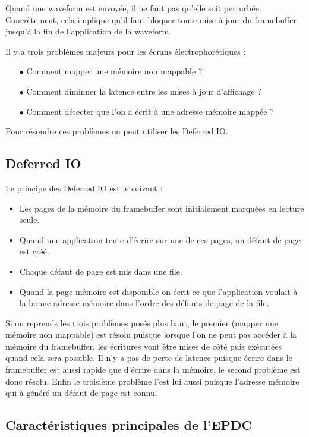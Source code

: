 Quand une waveform est envoyée, il ne faut pas qu'elle soit perturbée. Concrètement, cela implique qu'il faut bloquer toute mise à jour du framebuffer jusqu'à la fin de l'application de la waveform.

Il y a trois problèmes majeurs pour les écrans électrophorétiques :
\begin{itemize}
	\item[$\bullet$] Comment mapper une mémoire non mappable ?
	\item[$\bullet$] Comment diminuer la latence entre les mises à jour d'affichage ?
	\item[$\bullet$] Comment détecter que l'on a écrit à une adresse mémoire mappée ?
\end{itemize}

Pour résoudre ces problèmes on peut utiliser les Deferred IO.

\subsection{Deferred IO}

Le principe des Deferred IO est le suivant :
\begin{itemize}
\renewcommand{\labelitemi}{$\bullet$}
	\item Les pages de la mémoire du framebuffer sont initialement marquées en lecture seule.
	\item Quand une application tente d'écrire sur une de ces pages, un défaut de page est créé.
	\item Chaque défaut de page est mis dans une file.
	\item Quand la page mémoire est disponible on écrit ce que l'application voulait à la bonne adresse mémoire dans l'ordre des défauts de page de la file. 
\end{itemize} 

Si on reprends les trois problèmes posés plus haut, le premier (mapper une mémoire non mappable) est résolu puisque lorsque l'on ne peut pas accéder à la mémoire du framebuffer, les écritures vont être mises de côté puis exécutées quand cela sera possible. 
Il n'y a pas de perte de latence puisque écrire dans le framebuffer est aussi rapide que d'écrire dans la mémoire, le second problème est donc résolu.
Enfin le troisième problème l'est lui aussi puisque l'adresse mémoire qui à généré un défaut de page est connu.
\subsection{Caractéristiques principales de l'EPDC}

